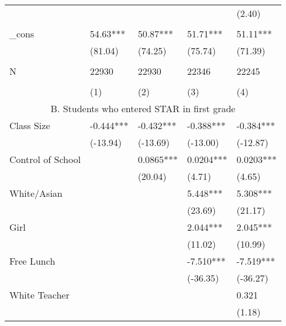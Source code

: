 \documentclass{article}
\begin{document}
\begin{table}[htbp]
\begin{tabular}{lllrr}
          &       &       & \multicolumn{1}{l}{} & \multicolumn{1}{l}{(2.40)} \\
          &       &       &       &  \\
    \_cons & 54.63*** & 50.87*** & \multicolumn{1}{l}{51.71***} & \multicolumn{1}{l}{51.11***} \\
          & (81.04) & (74.25) & \multicolumn{1}{l}{(75.74)} & \multicolumn{1}{l}{(71.39)} \\
          &       &       &       &  \\
    N     & 22930 & 22930 & \multicolumn{1}{l}{22346} & \multicolumn{1}{l}{22245} \\
          &       &       &       &  \\
          & (1)   & (2)   & \multicolumn{1}{l}{(3)} & \multicolumn{1}{l}{(4)} \\
    \midrule
    \multicolumn{5}{c}{B. Students who entered STAR in first grade} \\
    Class Size & -0.444*** & -0.432*** & \multicolumn{1}{l}{-0.388***} & \multicolumn{1}{l}{-0.384***} \\
          & (-13.94) & (-13.69) & \multicolumn{1}{l}{(-13.00)} & \multicolumn{1}{l}{(-12.87)} \\
    Control of School &       & 0.0865*** & \multicolumn{1}{l}{0.0204***} & \multicolumn{1}{l}{0.0203***} \\
          &       & (20.04) & \multicolumn{1}{l}{(4.71)} & \multicolumn{1}{l}{(4.65)} \\
    White/Asian &       &       & \multicolumn{1}{l}{5.448***} & \multicolumn{1}{l}{5.308***} \\
          &       &       & \multicolumn{1}{l}{(23.69)} & \multicolumn{1}{l}{(21.17)} \\
    Girl  &       &       & \multicolumn{1}{l}{2.044***} & \multicolumn{1}{l}{2.045***} \\
          &       &       & \multicolumn{1}{l}{(11.02)} & \multicolumn{1}{l}{(10.99)} \\
    Free Lunch &       &       & \multicolumn{1}{l}{-7.510***} & \multicolumn{1}{l}{-7.519***} \\
          &       &       & \multicolumn{1}{l}{(-36.35)} & \multicolumn{1}{l}{(-36.27)} \\
    White Teacher &       &       & \multicolumn{1}{l}{} & \multicolumn{1}{l}{0.321} \\
          &       &       & \multicolumn{1}{l}{} & \multicolumn{1}{l}{(1.18)} \\

\end{tabular}
\end{table}
\end{document}
